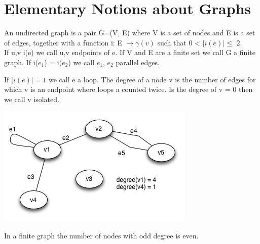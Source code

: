\chapter{Elementary Notions about Graphs}

\begin{descr}
\end{descr}


\begin{definition}
	An undirected graph is a pair G=(V, E) where V is a set of nodes and E is a set of edges, together with a function i: E $\rightarrow \gamma(v)$ such that 0 < $\mid i(e) \mid  \le $ 2.
\\
If u,v i(e) we call u,v endpoints of e. If V and E are a finite set we call G a finite graph. If i($e{_1}$) =  i($e{_2}$) we call  $e{_1}$, $e{_2}$ parallel edges.

If $\mid i(e) \mid = 1$ we call e a loop. The degree of a node v is the number of edges for which v is an endpoint where loops a counted twice.
Is the degree of v = 0 then we call v isolated.
\end{definition}

\begin{example*}
\includegraphics{diagrams/Chapter1_Example1.jpg} \\
\end{example*}

\begin{lemma}
    In a finite graph the number of nodes with odd degree is even.
\end{lemma}


